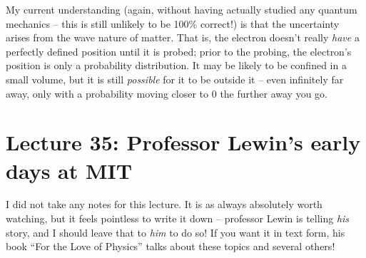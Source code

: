 My current understanding (again, without having actually studied any quantum mechanics -- this is still unlikely to be 100\% correct!) is that the uncertainty arises from the wave nature of matter. That is, the electron doesn't really \emph{have} a perfectly defined position until it is probed; prior to the probing, the electron's position is only a probability distribution. It may be likely to be confined in a small volume, but it is still \emph{possible} for it to be outside it -- even infinitely far away, only with a probability moving closer to 0 the further away you go.

\section{Lecture 35: Professor Lewin's early days at MIT}

I did not take any notes for this lecture. It is as always absolutely worth watching, but it feels pointless to write it down -- professor Lewin is telling \emph{his} story, and I should leave that to \emph{him} to do so! If you want it in text form, his book ``For the Love of Physics'' talks about  these topics and several others!

